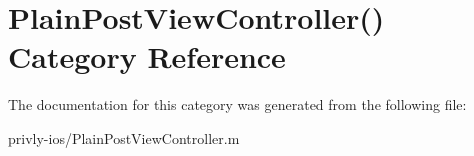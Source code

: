 \hypertarget{category_plain_post_view_controller_07_08}{\section{Plain\-Post\-View\-Controller() Category Reference}
\label{category_plain_post_view_controller_07_08}
}


The documentation for this category was generated from the following file\-:\begin{DoxyCompactItemize}
\item 
privly-\/ios/Plain\-Post\-View\-Controller.\-m\end{DoxyCompactItemize}
